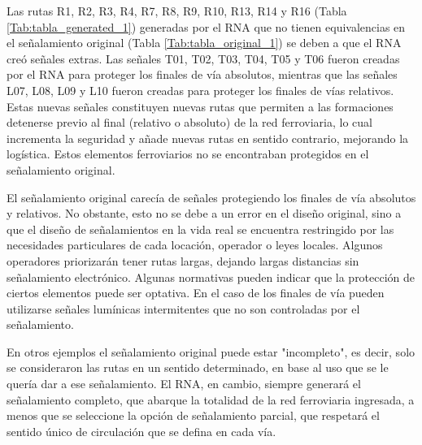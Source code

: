     Las rutas R1, R2, R3, R4, R7, R8, R9, R10, R13, R14 y R16 (Tabla \ref{Tab:tabla_generated_1}) generadas por el RNA que no tienen equivalencias en el señalamiento original (Tabla \ref{Tab:tabla_original_1}) se deben a que el RNA creó señales extras. Las señales T01, T02, T03, T04, T05 y T06 fueron creadas por el RNA para proteger los finales de vía absolutos, mientras que las señales L07, L08, L09 y L10 fueron creadas para proteger los finales de vías relativos. Estas nuevas señales constituyen nuevas rutas que permiten a las formaciones detenerse previo al final (relativo o absoluto) de la red ferroviaria, lo cual incrementa la seguridad y añade nuevas rutas en sentido contrario, mejorando la logística. Estos elementos ferroviarios no se encontraban protegidos en el señalamiento original.
    
    El señalamiento original carecía de señales protegiendo los finales de vía absolutos y relativos. No obstante, esto no se debe a un error en el diseño original, sino a que el diseño de señalamientos en la vida real se encuentra restringido por las necesidades particulares de cada locación, operador o leyes locales. Algunos operadores priorizarán tener rutas largas, dejando largas distancias sin señalamiento electrónico. Algunas normativas pueden indicar que la protección de ciertos elementos puede ser optativa. En el caso de los finales de vía pueden utilizarse señales lumínicas intermitentes que no son controladas por el señalamiento.
    
    En otros ejemplos el señalamiento original puede estar "incompleto", es decir, solo se consideraron las rutas en un sentido determinado, en base al uso que se le quería dar a ese señalamiento. El RNA, en cambio, siempre generará el señalamiento completo, que abarque la totalidad de la red ferroviaria ingresada, a menos que se seleccione la opción de señalamiento parcial, que respetará el sentido único de circulación que se defina en cada vía.    